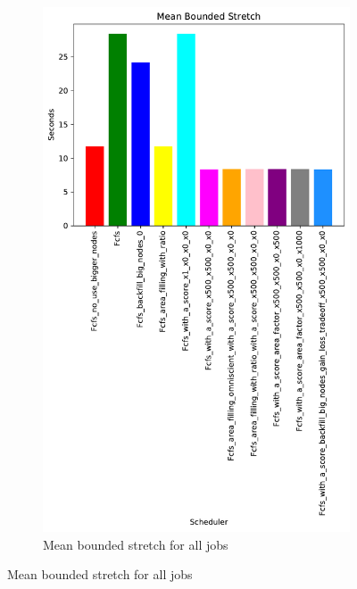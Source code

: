\documentclass[a4paper]{article}
\begin{document}
\begin{figure}[H]\centering
\begin{subfigure}[b]{0.4\linewidth}\centering\includegraphics[width=0.7\linewidth]{MBSS/plot/Results_Size_And_Data_2022-03-01->2022-03-03_V85105_Mean_Stretch_With_a_Minimum_450_128_32_256_4_1024.pdf}\caption{Mean bounded stretch for all jobs}\label{45}\end{subfigure}

\end{figure}
\end{document}
